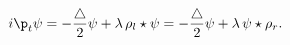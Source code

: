 \begin{equation}
i\p_{t}\psi=-\frac{\bigtriangleup}{2}\psi
+\lambda\,\rho_{l}\star\psi=
-\frac{\bigtriangleup}{2}\psi
+\lambda\,\psi\star\rho_{r}.
\label{NLS}
\end{equation}

